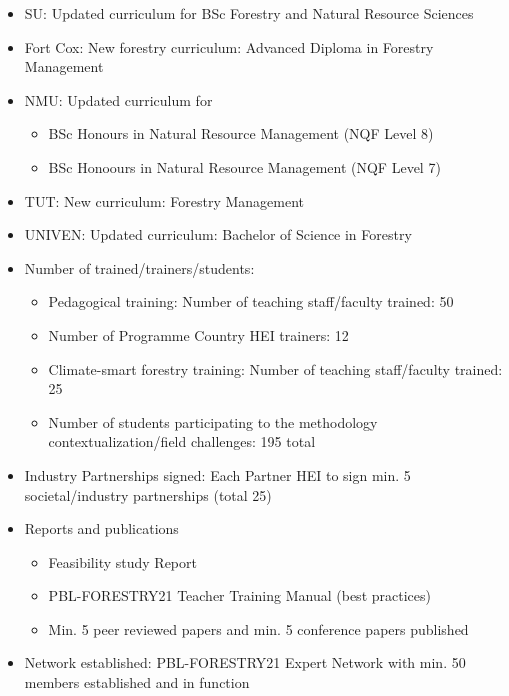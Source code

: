 \documentclass[
  11pt,
]{article}
\begin{document}
\begin{itemize}
\item
  SU: Updated curriculum for BSc Forestry and Natural Resource Sciences
\item
  Fort Cox: New forestry curriculum: Advanced Diploma in Forestry
  Management
\item
  NMU: Updated curriculum for

  \begin{itemize}
  \item
    BSc Honours in Natural Resource Management (NQF Level 8)
  \item
    BSc Honoours in Natural Resource Management (NQF Level 7)
  \end{itemize}
\item
  TUT: New curriculum: Forestry Management
\item
  UNIVEN: Updated curriculum: Bachelor of Science in Forestry
\item
  Number of trained/trainers/students:

  \begin{itemize}
  \item
    Pedagogical training: Number of teaching staff/faculty trained: 50
  \item
    Number of Programme Country HEI trainers: 12
  \item
    Climate-smart forestry training: Number of teaching staff/faculty
    trained: 25
  \item
    Number of students participating to the methodology
    contextualization/field challenges: 195 total
  \end{itemize}
\item
  Industry Partnerships signed: Each Partner HEI to sign min. 5
  societal/industry partnerships (total 25)
\item
  Reports and publications

  \begin{itemize}
  \item
    Feasibility study Report
  \item
    PBL-FORESTRY21 Teacher Training Manual (best practices)
  \item
    Min. 5 peer reviewed papers and min. 5 conference papers published
  \end{itemize}
\item
  Network established: PBL-FORESTRY21 Expert Network with min. 50
  members established and in function
\end{itemize}
\end{document}

